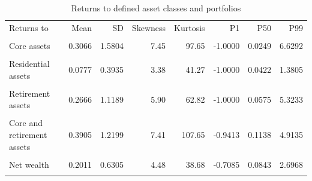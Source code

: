 \begin{table}[htbp]\centering\small
\caption{Returns to defined asset classes and portfolios}
\label{tab:returns_portfolio_moments_pooled}
\begin{tabular}{lrrrrrrr}\toprule
Returns to & Mean & SD & Skewness & Kurtosis & P1 & P50 & P99 \\\\ \midrule
Core assets & 0.3066 & 1.5804 & 7.45 & 97.65 & -1.0000 & 0.0249 & 6.6292 \\\\
Residential assets & 0.0777 & 0.3935 & 3.38 & 41.27 & -1.0000 & 0.0422 & 1.3805 \\\\
Retirement assets & 0.2666 & 1.1189 & 5.90 & 62.82 & -1.0000 & 0.0575 & 5.3233 \\\\
\addlinespace
Core and retirement assets & 0.3905 & 1.2199 & 7.41 & 107.65 & -0.9413 & 0.1138 & 4.9135 \\\\
Net wealth & 0.2011 & 0.6305 & 4.48 & 38.68 & -0.7085 & 0.0843 & 2.6968 \\\\
\bottomrule
\end{tabular}
\end{table}
